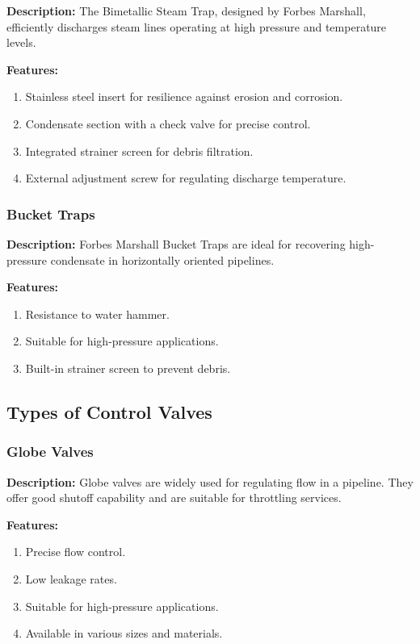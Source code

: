 \textbf{Description:} The Bimetallic Steam Trap, designed by Forbes Marshall, efficiently discharges steam lines operating at high pressure and temperature levels.

\textbf{Features:}
\begin{enumerate}
    \item Stainless steel insert for resilience against erosion and corrosion.
    \item Condensate section with a check valve for precise control.
    \item Integrated strainer screen for debris filtration.
    \item External adjustment screw for regulating discharge temperature.
\end{enumerate}
\subsubsection{Bucket Traps}

\textbf{Description:} Forbes Marshall Bucket Traps are ideal for recovering high-pressure condensate in horizontally oriented pipelines.

\textbf{Features:}
\begin{enumerate}
    \item Resistance to water hammer.
    \item Suitable for high-pressure applications.
    \item Built-in strainer screen to prevent debris.
\end{enumerate}

\subsection{Types of Control Valves}

\subsubsection{Globe Valves}

\textbf{Description:} Globe valves are widely used for regulating flow in a pipeline. They offer good shutoff capability and are suitable for throttling services.

\textbf{Features:}
\begin{enumerate}
    \item Precise flow control.
    \item Low leakage rates.
    \item Suitable for high-pressure applications.
    \item Available in various sizes and materials.
\end{enumerate}
